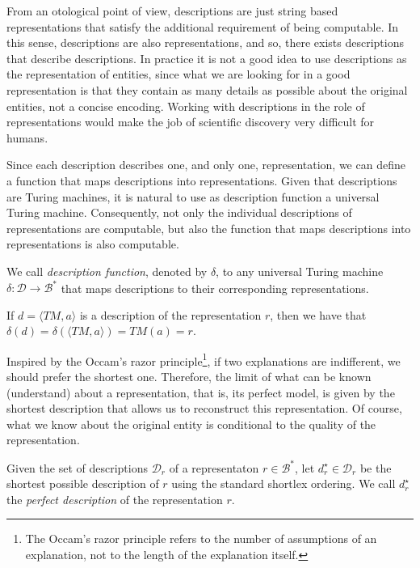 From an otological point of view, descriptions are just string based representations that satisfy the additional requirement of being computable. In this sense, descriptions are also representations, and so, there exists descriptions that describe descriptions. In practice it is not a good idea to use descriptions as the representation of entities, since what we are looking for in a good representation is that they contain as many details as possible about the original entities, not a concise encoding. Working with descriptions in the role of representations would make the job of scientific discovery very difficult for humans.

Since each description describes one, and only one, representation, we can define a function that maps descriptions into representations. Given that descriptions are Turing machines, it is natural to use as description function a universal Turing machine. Consequently, not only the individual descriptions of representations are computable, but also the function that maps descriptions into representations is also computable.

\begin{definition}
We call \emph{description function}, denoted by $\delta$, to any universal Turing machine $\delta : \mathcal{D} \rightarrow \mathcal{B}^\ast$ that maps descriptions to their corresponding representations.
\end{definition}

If $d = \langle TM, a \rangle$ is a description of the representation $r$, then we have that $\delta \left( d \right) = \delta \left( \langle TM, a \rangle \right) = TM(a) = r$.

Inspired by the Occam's razor principle\footnote{The Occam's razor principle refers to the number of assumptions of an explanation, not to the length of the explanation itself.}, if two explanations are indifferent, we should prefer the shortest one. Therefore, the limit of what can be known (understand) about a representation, that is, its perfect model, is given by the shortest description that allows us to reconstruct this representation. Of course, what we know about the original entity is conditional to the quality of the representation.

\begin{definition}
\label{def:descriptions_perfect_model}
Given the set of descriptions $\mathcal{D}_r$ of a representaton $r \in \mathcal{B}^\ast$, let $d_r^{\star} \in \mathcal{D}_r$ be the shortest possible description of $r$ using the standard shortlex ordering. We call $d_r^{\star}$ the \emph{perfect description} of the representation $r$.
\end{definition}

